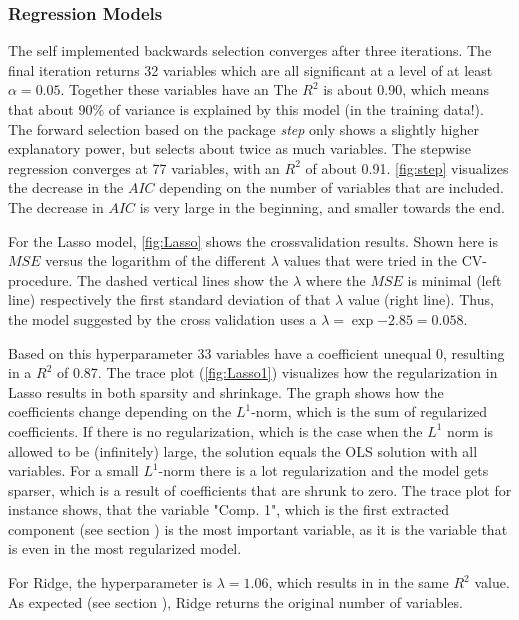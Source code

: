 
\subsubsection{Regression Models}
The self implemented backwards selection converges after three iterations. The final iteration returns 32 variables which are all significant at a level of at least $\alpha=0.05$. Together these variables have an 
The $R^{2}$ is about 0.90, which means that about 90\% of variance is explained by this model (in the training data!).
The forward selection based on the package \textit{step} only shows a slightly higher explanatory power, but selects about twice as much variables.  The stepwise regression converges at 77 variables, with an $R^{2}$ of about 0.91. 
\autoref{fig:step} visualizes the decrease in the $AIC$ depending on the number of variables that are included. The decrease in $AIC$ is very large in the beginning, and smaller towards the end. 


For the Lasso model, \autoref{fig:Lasso} shows the crossvalidation results. Shown here is  $MSE$ versus the logarithm of the different $\lambda$ values that were tried in the CV-procedure. The dashed vertical lines show the $\lambda$ where the $MSE$ is minimal (left line) respectively the first standard deviation of that $\lambda$ value (right line). Thus, the model suggested by the cross validation uses a $\lambda = \exp{-2.85}=0.058$. 

Based on this hyperparameter 33 variables have a coefficient unequal $0$, resulting in a $R^{2}$ of 0.87. 
The trace plot (\autoref{fig:Lasso1}) visualizes how the regularization in Lasso results in both sparsity and shrinkage. The graph shows how the coefficients change depending on the $L^{1}$-norm, which is the sum of regularized coefficients. If there is no regularization, which is the case when the $L^{1}$ norm is allowed to be (infinitely) large,  the solution equals the OLS solution with all variables. For a small $L^{1}$-norm there is a lot regularization and the model gets sparser, which is a result of coefficients that are shrunk to zero. The trace plot for instance shows, that the variable  "Comp. 1", which is the first extracted component (see section ) is the most important variable, as it is the variable that is even in the most regularized model.

For Ridge, the hyperparameter is $\lambda = 1.06$, which results in in the same $R^{2}$ value. As expected (see section ), Ridge returns the original number of variables. 

